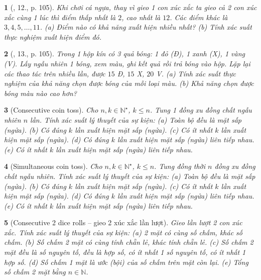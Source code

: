 \documentclass{article}
\newtheorem{baitoan}{}
\begin{document}
\begin{baitoan}[\cite{Tuyen_Toan_6}, 12., p. 105]
	Khi chơi cá ngựa, thay vì gieo 1 con xúc xắc ta gieo cả 2 con xúc xắc cùng 1 lúc thì điểm thấp nhất là $2$, cao nhất là $12$. Các điểm khác là $3,4,5,\ldots,11$. (a) Điểm nào có khả năng xuất hiện nhiều nhất? (b) Tính xác suất thực nghiệm xuất hiện điểm đó.
\end{baitoan}

\begin{baitoan}[\cite{Tuyen_Toan_6}, 13., p. 105]
	Trong 1 hộp kín có 3 quả bóng: 1 đỏ (Đ), 1 xanh (X), 1 vàng (V). Lấy ngẫu nhiên 1 bóng, xem màu, ghi kết quả rồi trả bóng vào hộp. Lặp lại các thao tác trên nhiều lần, được $15$ Đ, $15$ X, $20$ V. (a) Tính xác suất thực nghiệm của khả năng chọn được bóng của mỗi loại màu. (b) Khả năng chọn được bóng màu nào cao hơn?
\end{baitoan}

\begin{baitoan}[Consecutive coin toss]
	Cho $n,k\in\mathbb{N}^\star$, $k\le n$. Tung 1 đồng xu đồng chất ngẫu nhiên $n$ lần. Tính xác suất lý thuyết của sự kiện: (a) Toàn bộ đều là mặt sấp (ngửa). (b) Có đúng $k$ lần xuất hiện mặt sấp (ngửa). (c) Có ít nhất $k$ lần xuất hiện mặt sấp (ngửa). (d) Có đúng $k$ lần xuất hiện mặt sấp (ngửa) liên tiếp nhau. (e) Có ít nhất $k$ lần xuất hiện mặt sấp (ngửa) liên tiếp nhau.
\end{baitoan}

\begin{baitoan}[Simultaneous coin toss]
	Cho $n,k\in\mathbb{N}^\star$, $k\le n$. Tung đồng thời $n$ đồng xu đồng chất ngẫu nhiên. Tính xác suất lý thuyết của sự kiện: (a) Toàn bộ đều là mặt sấp (ngửa). (b) Có đúng $k$ lần xuất hiện mặt sấp (ngửa). (c) Có ít nhất $k$ lần xuất hiện mặt sấp (ngửa). (d) Có đúng $k$ lần xuất hiện mặt sấp (ngửa) liên tiếp nhau. (e) Có ít nhất $k$ lần xuất hiện mặt sấp (ngửa) liên tiếp nhau.
\end{baitoan}

\begin{baitoan}[Consecutive 2 dice rolls -- gieo 2 xúc xắc lần lượt]
	Gieo lần lượt 2 con xúc xắc. Tính xác suất lý thuyết của sự kiện: (a) 2 mặt có cùng số chấm, khác số chấm. (b) Số chấm 2 mặt có cùng tính chẵn lẻ, khác tính chẵn lẻ. (c) Số chấm 2 mặt đều là số nguyên tố, đều là hợp số, có ít nhất 1 số nguyên tố, có ít nhất 1 hợp số. (d) Số chấm 1 mặt là ước (bội) của số chấm trên mặt còn lại. (e) Tổng số chấm 2 mặt bằng $n\in\mathbb{N}$.
\end{baitoan}
\end{document}
